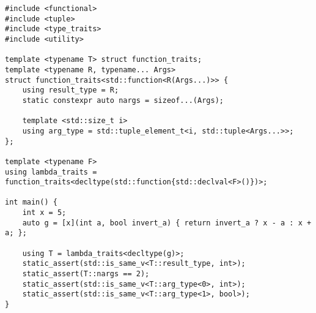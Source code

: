 \begin{lstlisting}[title=\href{https://godbolt.org/z/e9dG88}{\texttt{godbolt.org/z/e9dG88}}]
#include <functional>
#include <tuple>
#include <type_traits>
#include <utility>

template <typename T> struct function_traits;
template <typename R, typename... Args> 
struct function_traits<std::function<R(Args...)>> {
    using result_type = R;
    static constexpr auto nargs = sizeof...(Args);

    template <std::size_t i>
    using arg_type = std::tuple_element_t<i, std::tuple<Args...>>;
};

template <typename F>
using lambda_traits = function_traits<decltype(std::function{std::declval<F>()})>;

int main() {
    int x = 5;
    auto g = [x](int a, bool invert_a) { return invert_a ? x - a : x + a; };

    using T = lambda_traits<decltype(g)>;
    static_assert(std::is_same_v<T::result_type, int>);
    static_assert(T::nargs == 2);
    static_assert(std::is_same_v<T::arg_type<0>, int>);
    static_assert(std::is_same_v<T::arg_type<1>, bool>);
}
\end{lstlisting}
